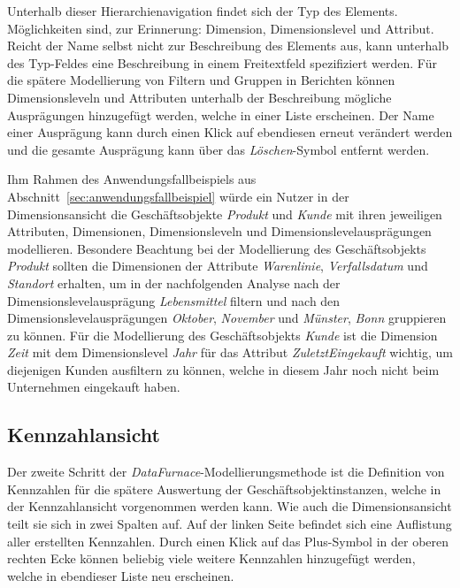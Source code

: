 \documentclass[
  language=german, %
  type=bachelor%
]{isthesis}
\begin{document}
\begin{content}
  Unterhalb dieser Hierarchienavigation findet sich der Typ des Elements.
  Möglichkeiten sind, zur Erinnerung: Dimension, Dimensionslevel und Attribut.
  Reicht der Name selbst nicht zur Beschreibung des Elements aus, kann
  unterhalb des Typ-Feldes eine Beschreibung in einem Freitextfeld spezifiziert
  werden. Für die spätere Modellierung von Filtern und Gruppen in Berichten
  können Dimensionsleveln und Attributen unterhalb der Beschreibung mögliche
  Ausprägungen hinzugefügt werden, welche in einer Liste erscheinen. Der Name
  einer Ausprägung kann durch einen Klick auf ebendiesen erneut verändert
  werden und die gesamte Ausprägung kann über das
  \textit{Löschen}-Symbol entfernt werden.

  Ihm Rahmen des Anwendungsfallbeispiels aus
  Abschnitt~\ref{sec:anwendungsfallbeispiel} würde ein Nutzer in der
  Dimensionsansicht die Geschäftsobjekte \textit{Produkt} und \textit{Kunde}
  mit ihren jeweiligen Attributen, Dimensionen, Dimensionsleveln und
  Dimensionslevelausprägungen modellieren. Besondere Beachtung bei der
  Modellierung des Geschäftsobjekts \textit{Produkt} sollten die Dimensionen
  der Attribute \textit{Warenlinie}, \textit{Verfallsdatum} und
  \textit{Standort} erhalten, um in der nachfolgenden Analyse nach der
  Dimensionslevelausprägung \textit{Lebensmittel} filtern und nach den
  Dimensionslevelausprägungen \textit{Oktober}, \textit{November} und
  \textit{Münster}, \textit{Bonn} gruppieren zu können. Für die Modellierung
  des Geschäftsobjekts \textit{Kunde} ist die Dimension \textit{Zeit} mit dem
  Dimensionslevel \textit{Jahr} für das Attribut \textit{ZuletztEingekauft}
  wichtig, um diejenigen Kunden ausfiltern zu können, welche in diesem Jahr
  noch nicht beim Unternehmen eingekauft haben.


  \subsection{Kennzahlansicht}

  Der zweite Schritt der \textit{DataFurnace}-Modellierungsmethode ist die
  Definition von Kennzahlen für die spätere Auswertung der
  Geschäftsobjektinstanzen, welche in der Kennzahlansicht vorgenommen werden
  kann. Wie auch die Dimensionsansicht teilt sie sich in zwei Spalten auf. Auf
  der linken Seite befindet sich eine Auflistung aller erstellten Kennzahlen.
  Durch einen Klick auf das Plus-Symbol in der oberen rechten Ecke können
  beliebig viele weitere Kennzahlen hinzugefügt werden, welche in ebendieser
  Liste neu erscheinen.


\end{content}
\end{document}

